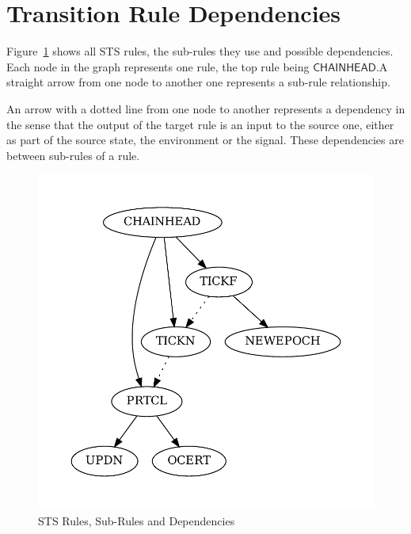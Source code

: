 \section{Transition Rule Dependencies}
\label{sec:sts-rules-overview}

Figure~\ref{fig:sts-rules-dependencies} shows all STS rules, the sub-rules they
use and possible dependencies. Each node in the graph represents one rule, the
top rule being $\mathsf{CHAINHEAD}$.\@ A straight arrow from one node to another
one represents a sub-rule relationship.

An arrow with a dotted line from one node to another represents a dependency in
the sense that the output of the target rule is an input to the source one,
either as part of the source state, the environment or the signal. These
dependencies are between sub-rules of a rule.

\begin{figure}[htp]
  \centering
  \includegraphics[width=\textwidth]{rules}
  \caption{STS Rules, Sub-Rules and Dependencies}
  \label{fig:sts-rules-dependencies}
\end{figure}

